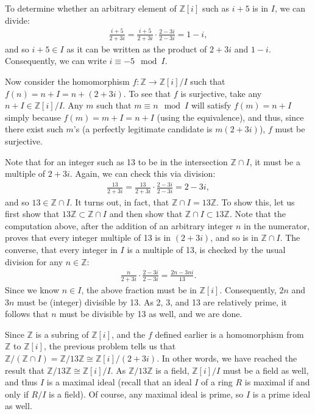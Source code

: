 \documentclass{../../mathnotes}
\begin{document}
To determine whether an arbitrary element of $\mathbb{Z}[i]$ such as $i+5$ is in $I$, we can divide:
\begin{align*}
    \frac{i+5}{2+3i}=\frac{i+5}{2+3i}\cdot\frac{2-3i}{2-3i}=1-i,
\end{align*}
and so $i+5\in I$ as it can be written as the product of $2+3i$ and $1-i$. Consequently, we can write $i\equiv-5\mod I$.

Now consider the homomorphism $f:\mathbb{Z}\to\mathbb{Z}[i]/I$ such that $f(n)=n+I=n+(2+3i)$. To see that $f$ is
surjective, take any $n+I\in\mathbb{Z}[i]/I$. Any $m$ such that $m\equiv n\mod I$ will satisfy $f(m)=n+I$ simply
because $f(m)=m+I=n+I$ (using the equivalence), and thus, since there exist such $m$'s (a perfectly legitimate candidate
is $m(2+3i)$), $f$ must be surjective.

Note that for an integer such as 13 to be in the intersection $\mathbb{Z}\cap I$, it must be a multiple of $2+3i$.
Again, we can check this via division:
\begin{align*}
    \frac{13}{2+3i}=\frac{13}{2+3i}\cdot\frac{2-3i}{2-3i}=2-3i,
\end{align*}
and so $13\in\mathbb{Z}\cap I$. It turns out, in fact, that $\mathbb{Z}\cap I=13\mathbb{Z}$. To show this, let us
first show that $13\mathbb{Z}\subset \mathbb{Z}\cap I$ and then show that $\mathbb{Z}\cap I\subset 13\mathbb{Z}$.
Note that the computation above, after the addition of an arbitrary integer $n$ in the numerator, proves that every
integer multiple of 13 is in $(2+3i)$, and so is in $\mathbb{Z}\cap I$.
The converse, that every integer in $I$ is a multiple of 13, is checked by the usual division for any $n\in\mathbb{Z}$:
\begin{align*}
    \frac{n}{2+3i}\cdot\frac{2-3i}{2-3i}=\frac{2n-3ni}{13}.
\end{align*}
Since we know $n\in I$, the above fraction must be in $\mathbb{Z}[i]$. Consequently, $2n$ and $3n$ must be (integer)
divisible by 13. As 2, 3, and 13 are relatively prime, it follows that $n$ must be divisible by 13 as well, and
we are done.

Since $\mathbb{Z}$ is a subring of $\mathbb{Z}[i]$, and the $f$ defined earlier is a homomorphism from $\mathbb{Z}$
to $\mathbb{Z}[i]$, the previous problem tells us that
$\mathbb{Z}/\left( \mathbb{Z}\cap I \right)=\mathbb{Z}/13\mathbb{Z}\cong \mathbb{Z}[i]/(2+3i)$. In other words,
we have reached the result that $\mathbb{Z}/13\mathbb{Z}\cong \mathbb{Z}[i]/I$. As $\mathbb{Z}/13\mathbb{Z}$ is a
field, $\mathbb{Z}[i]/I$ must be a field as well, and thus $I$ is a maximal ideal (recall that an ideal $I$ of a ring
$R$ is maximal if and only if $R/I$ is a field). Of course, any maximal ideal is prime, so $I$ is a prime ideal as well.
\end{document}
